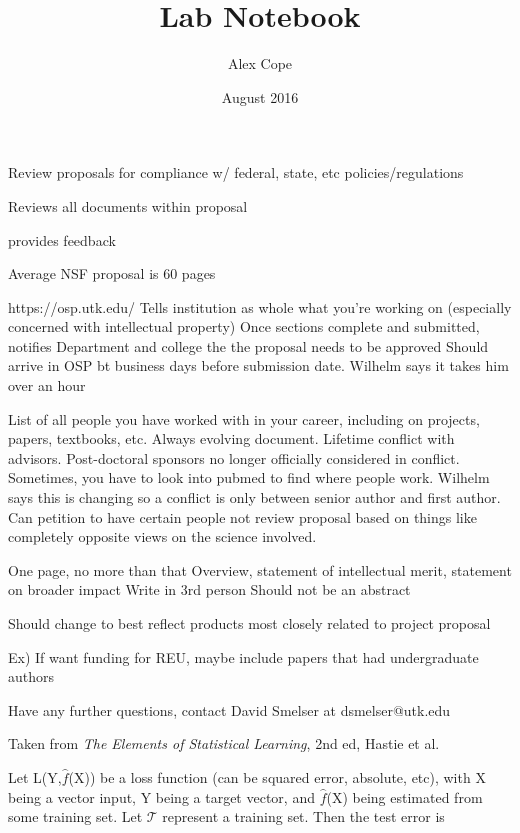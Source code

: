 \documentclass[11pt]{labbook}
\title{Lab Notebook}
\author{Alex Cope}
\date{August 2016}
\begin{document}
\maketitle
\let\cleardoublepage\clearpage
\tableofcontents
{}
Review proposals for compliance w/ federal, state, etc policies/regulations

Reviews all documents within proposal

provides feedback

Average NSF proposal is 60 pages

https://osp.utk.edu/
Tells institution as whole what you're working on (especially concerned with intellectual property)
Once sections complete and submitted, notifies Department and college the the proposal needs to be approved
Should arrive in OSP bt  business days before submission date. 
Wilhelm says it takes him over an hour

List of all people you have worked with in your career, including on projects, papers, textbooks, etc.
Always evolving document.
Lifetime conflict with advisors.
Post-doctoral sponsors no longer officially considered in conflict.
Sometimes, you have to look into pubmed to find where people work.
Wilhelm says this is changing so a conflict is only between senior author and first author.
Can petition to have certain people not review proposal based on things like completely opposite views on the science involved.

One page, no more than that
Overview, statement of intellectual merit, statement on broader impact
Write in 3rd person
Should not be an abstract

Should change to best reflect products most closely related to project proposal

Ex) If want funding for REU, maybe include papers that had undergraduate authors

Have any further questions, contact David Smelser at dsmelser@utk.edu
 

Taken from \textit{The Elements of Statistical Learning}, 2nd ed, Hastie et al.
 
Let L(Y,$\hat{f}$(X)) be a loss function (can be squared error, absolute, etc), with X being a vector input, Y being a target vector, and $\hat{f}$(X) being estimated from some training set. Let $\mathcal{T}$ represent a training set. Then the test error is
\end{document}
